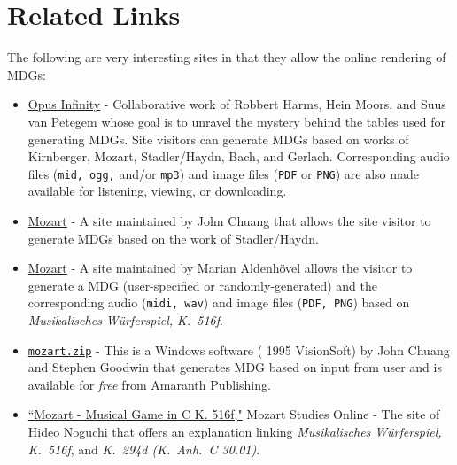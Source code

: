 \documentclass[a4paper,x11names,svgnames,10pt]{article}
\begin{document}
{%
%	


\newpage
\section{Related Links}
The following are very interesting sites in that they allow the online rendering of MDGs:
\begin{itemize}
	\item \href{https://opus-infinity.org}{Opus Infinity} - Collaborative work of Robbert Harms, Hein Moors, and Suus van Petegem whose goal is to unravel the mystery behind the tables used for generating MDGs.  Site visitors can generate MDGs based on works of Kirnberger, Mozart, Stadler/Haydn, Bach, and Gerlach.  Corresponding audio files ({\tt mid, ogg,} and/or {\tt mp3}) and image files ({\tt PDF} or {\tt PNG}) are also made available for listening, viewing, or downloading.
	
	\item  \href{http://sunsite.univie.ac.at/Mozart/dice/}{Mozart} - A site maintained by John Chuang that allows the site visitor to generate MDGs based on the work of Stadler/Haydn.
	
	\item  \href{https://marian-aldenhoevel.de/mozart/}{Mozart} - A site maintained by Marian Aldenh\"{o}vel allows the visitor to generate a MDG (user-specified or randomly-generated) and the corresponding audio ({\tt midi, wav}) and image files ({\tt PDF, PNG}) based on {\em Musikalisches W\"{u}rferspiel, K.\ 516f}.
	
	\item \href{https://www.amaranthpublishing.com/mozart.zip}{\tt mozart.zip} -  This is a Windows software ({\small\textcopyright} 1995 VisionSoft) by John Chuang and Stephen Goodwin that generates MDG based on input from user and is available for {\it free} from  \href{http://www.amaranthpublishing.com/MozartDiceGame.htm}{Amaranth Publishing}.  
	
	\item \href{http://www.asahi-net.or.jp/\~rb5h-ngc/e/k516f.htm}{``Mozart - Musical Game in C K. 516f,"}	Mozart Studies Online - The site of Hideo Noguchi that offers an explanation linking {\em Musikalisches W\"{u}rferspiel, K.\ 516f}, and  {\em K.\ 294d (K.\ Anh.\ C 30.01)}. 
\end{itemize}

}
\end{document}
